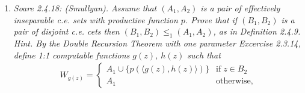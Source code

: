 \documentclass{article}
\begin{document}
\begin{enumerate}[label={\bf Q\arabic*:}]
\begin{enumerate}[label={(\roman*)}]
\begin{proof}
          and
          \begin{align*}
            W_{f_1(\langle e_0,e_1\rangle)} :=
            \begin{cases}
              W_{e_1}, &\text{if}\; \psi(\langle e_0,e_1\rangle)\downarrow,\\
              \emptyset, &\text{otherwise}.\\
            \end{cases}
          \end{align*}

          By SMN again, there are total recursive functions $g_0,g_1$ that
          append $W_a$ to $W_{e_0}$ and append $W_b$ to $W_{e_1}$:
          \begin{align*}
            W_{g_0f_0(\langle e_0,e_1\rangle)} :=
            \begin{cases}
              W_{e_0}\cup W_a=W_{e_0}, &\text{if}\; \psi(\langle
                e_0,e_1\rangle)\downarrow,\\
              W_a\cup\emptyset =W_a, &\text{otherwise},\\
            \end{cases}
          \end{align*}

          and
          \begin{align*}
            W_{g_1f_1(\langle e_0,e_1\rangle)} :=
            \begin{cases}
              W_{e_1}\cup W_b=W_{e_1}, &\text{if}\; \psi(\langle
                e_0,e_1\rangle)\downarrow,\\
              W_b\cup\emptyset =W_b, &\text{otherwise}.\\
            \end{cases}
          \end{align*}

          Then
          \[q(\langle e_0,e_1\rangle) :=\psi(\langle g_0f_0(\langle
            e_0,e_1\rangle), g_1f_1(\langle e_0,e_1\rangle)\rangle)\]
          will give us the required total function.
        \end{proof}
    \end{enumerate}

  \item \it Soare 2.4.18: (Smullyan). Assume that $(A_1,A_2)$ is a pair of
    effectively inseparable c.e. sets with productive function $p$. Prove
    that if $(B_1,B_2)$ is a pair of disjoint c.e. cets then
    $(B_1,B_2)\leq_1(A_1,A_2)$, as in Definition 2.4.9. Hint. By the Double
    Recursion Theorem with one parameter Excercise 2.3.14, define 1:1
    computable functions $g(z)$, $h(z)$ such that
    \begin{align*}
      W_{g(z)}=
      \begin{cases}
        A_1\cup\{p(\langle g(z),h(z)\rangle)\} &\text{if}\; z\in B_2\\
        A_1 &\text{otherwise},
      \end{cases}
    \end{align*}


\end{enumerate}
\end{document}
